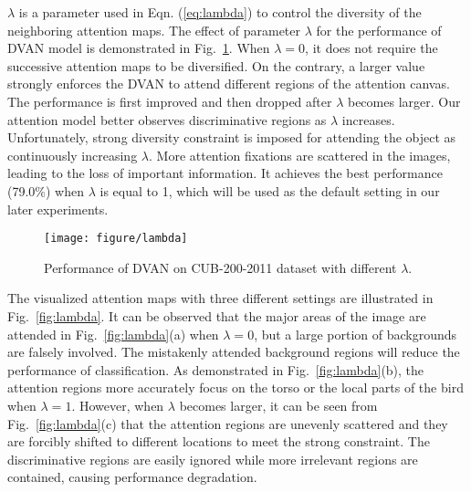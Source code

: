 \documentclass[journal]{IEEEtran}
\begin{document}
$\lambda$ is a parameter used in Eqn. (\ref{eq:lambda}) to control the diversity of the neighboring attention maps. The effect of parameter $\lambda$ for the performance of DVAN model is demonstrated in Fig.~\ref{fig:comparison_lambda}. When $\lambda = 0$, it does not require the successive attention maps to be diversified. On the contrary, a larger value strongly enforces the DVAN to attend different regions of the attention canvas. The performance is first improved and then dropped after $\lambda$ becomes larger. Our attention model better observes discriminative regions as $\lambda$ increases. Unfortunately, strong diversity constraint is imposed for attending the object as continuously increasing $\lambda$. More attention fixations are scattered in the images, leading to the loss of important information.
It achieves the best performance (79.0\%) when $\lambda$ is equal to 1, which will be used as the default setting in our later experiments.
\begin{figure}[t]
  \centering
  \texttt{[image: figure/lambda]}
  \vspace{-0.1in}
 \caption{Performance of DVAN on CUB-200-2011 dataset with different $\lambda$.}
  \label{fig:comparison_lambda}
    \vspace{-0.2in}
\end{figure}

The visualized attention maps with three different settings are illustrated in Fig.~\ref{fig:lambda}. It can be observed that the major areas of the image are attended in Fig.~\ref{fig:lambda}(a) when $\lambda=0$, but a large portion of backgrounds are falsely involved. The mistakenly attended background regions will reduce the performance of classification. As demonstrated in Fig.~\ref{fig:lambda}(b), the attention regions more accurately focus on the torso or the local parts of the bird when $\lambda=1$. However, when $\lambda$ becomes larger, it can be seen from Fig.~\ref{fig:lambda}(c) that the attention regions are unevenly scattered and they are forcibly shifted to different locations to meet the strong constraint. The discriminative regions are easily ignored while more irrelevant regions are contained, causing performance degradation.
\end{document}
